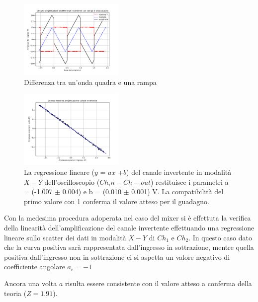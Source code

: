 \documentclass[journal]{IEEEtran}
\begin{document}
\begin{figure}[H]%
\begin {center}
\includegraphics[width=0.45\textwidth]{analysis/output/OPA_diff_squareramp.pdf}
\caption{Differenza tra un'onda quadra e una rampa}
\label{fig:diff_squareramp}
\end {center}
\end{figure}

\begin{figure}[H]%
\begin{center}
\includegraphics[width=0.45\textwidth]{analysis/output/OPA-linfit-inv.pdf}
\caption{La regressione lineare ($y$ = $ax$ +$b$) del canale invertente in modalità $X-Y$ dell'oscilloscopio ($Ch_in-Ch-out$) restituisce i parametri a = (-1.007 $\pm$ 0.004) e b = (0.010 $\pm$ 0.001) V. La compatibilità del primo valore con 1 conferma il valore atteso per il guadagno.}
\label{fig:lin-inv}
\end{center}
\end{figure}


Con la medesima procedura adoperata nel caso del mixer si è effettuta la verifica della linearità dell'amplificazione del canale invertente effettuando una regressione lineare sullo scatter dei dati in modalità $X-Y$ di $Ch_1$ e $Ch_2$.
In questo caso dato che la curva positiva sarà rappresentata dall'ingresso in sottrazione, mentre quella positiva dall'ingresso non in sottrazione ci si aspetta un valore negativo di coefficiente angolare $a_e = -1$

Ancora una volta $a$ risulta essere consistente con il valore atteso a conferma della teoria ($Z=1.91$).
\end{document}

